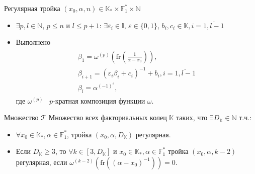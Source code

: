 \documentclass[8pt, xcolor=x11names]{beamer}
\begin{document}
\begin{frame}
    \begin{block}{Регулярная тройка $(x_{0},\alpha,n) \in \mathbb{K}_{*} \times \mathbb{F}_{1}^{*} \times \mathbb{N}$}
        \begin{itemize}
            \item $\exists p, l \in \mathbb{N}$, $p\le n$ и $l\le p+1$: $\exists \varepsilon_{i} \in \mathbb{I}$, $\varepsilon \in \{0,1\}$, $b_{i}, c_{i} \in \mathbb{K}, i = \overline{1,l-1}$
            
            \item Выполнено
            \begin{eqnarray*}
                \begin{array}{c}
                    \beta_{1}=\omega^{(p)}\left(\textrm{fr}\left(\frac{1}{\alpha-x_{0}}\right)\right),\\
                    \beta_{i+1}=(\varepsilon_{i}\beta_{i}+c_{i})^{-1}+b_{i}, i=\overline{1,l-1}\\
                    \beta_{l}=\alpha^{(-1)^{\varepsilon}},
                \end{array}
            \end{eqnarray*}
            где $\omega^{(p)}$ \textendash\ $p$-кратная композиция функции $\omega$.
        \end{itemize}
    \end{block}

    \begin{block}{Множество $\mathcal{T}$}
        Множество всех факториальных колец $\mathbb{K}$ таких, что $\exists D_\mathbb{K} \in \mathbb{N}$ т.ч.:
    
        \begin{itemize}
            \item $\forall x_{0}\in\mathbb{K}_{*}, \alpha\in\mathbb{F}_{1}^{*}$, тройка $(x_{0},\alpha,D_\mathbb{K})$ регулярная.
    
            \item Если $D_\mathbb{K}\ge3$, то $\forall k\in[3,D_\mathbb{K}]$ и $x_{0}\in\mathbb{K}_{*}, \alpha\in\mathbb{F}_{1}^{*}$ тройка $(x_{0},\alpha,k-2)$ регулярная, если $\omega^{(k-2)}(\textrm{fr}((\alpha-x_{0})^{-1}))=0.$
        \end{itemize}
    \end{block}
\end{frame}
\end{document}
